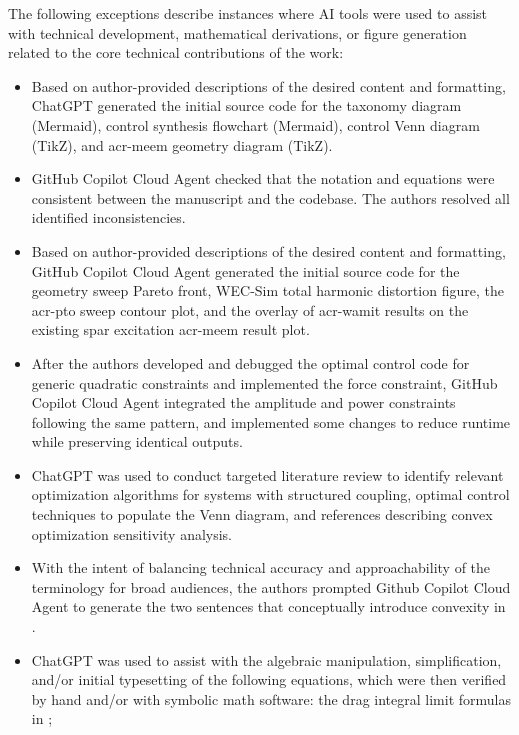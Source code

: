 \documentclass[a4paper,fleqn,colorlinks,unicode,hypertexnames=false]{cas-dc}
\begin{document}
The following exceptions describe instances where AI tools were used to assist with technical development, mathematical derivations, or figure generation related to the core technical contributions of the work:
\begin{itemize}[leftmargin=*]
\item Based on author-provided descriptions of the desired content and formatting, ChatGPT generated the initial source code for the taxonomy diagram (Mermaid), control synthesis flowchart (Mermaid), control Venn diagram (TikZ), and \gls{acr-meem} geometry diagram (TikZ).
\item GitHub Copilot Cloud Agent checked that the notation and equations were consistent between the manuscript and the codebase. The authors resolved all identified inconsistencies.
\item Based on author-provided descriptions of the desired content and formatting, GitHub Copilot Cloud Agent generated the initial source code for the geometry sweep Pareto front, WEC-Sim total harmonic distortion figure, the \gls{acr-pto} sweep contour plot, and the overlay of \gls{acr-wamit} results on the existing spar excitation \gls{acr-meem} result plot.
\item After the authors developed and debugged the optimal control code for generic quadratic constraints and implemented the force constraint, GitHub Copilot Cloud Agent integrated the amplitude and power constraints following the same pattern, and implemented some changes to reduce runtime while preserving identical outputs.
\item ChatGPT was used to conduct targeted literature review to identify relevant optimization algorithms for systems with structured coupling, optimal control techniques to populate the Venn diagram, and references describing convex optimization sensitivity analysis.
\item With the intent of balancing technical accuracy and approachability of the terminology for broad audiences, the authors prompted Github Copilot Cloud Agent to generate the two sentences that conceptually introduce convexity in .
\item ChatGPT was used to assist with the algebraic manipulation, simplification, and/or initial typesetting of the following equations, which were then verified by hand and/or with symbolic math software:
the drag integral limit formulas in ;

\end{itemize}
\end{document}
